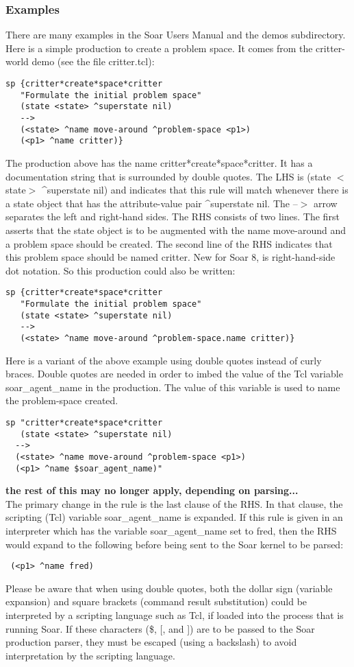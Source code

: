 \subsubsection*{Examples}
 There are many examples in the Soar Users Manual and the demos subdirectory. Here is a simple production to create a problem space. It comes from the critter-world demo (see the file critter.tcl): \begin{verbatim}
sp {critter*create*space*critter
   "Formulate the initial problem space"
   (state <state> ^superstate nil)
   -->
   (<state> ^name move-around ^problem-space <p1>)
   (<p1> ^name critter)}
\end{verbatim}
 The production above has the name critter*create*space*critter. It has a documentation string that is surrounded by double quotes. The LHS is (state $<$state$>$ \^{}superstate nil) and indicates that this rule will match whenever there is a state object that has the attribute-value pair \^{}superstate nil. The --$>$ arrow separates the left and right-hand sides. The RHS consists of two lines. The first asserts that the state object is to be augmented with the name move-around and a problem space should be created. The second line of the RHS indicates that this problem space should be named critter. 
  New for Soar 8, is right-hand-side dot notation. So this production could also be written: \begin{verbatim}
sp {critter*create*space*critter
   "Formulate the initial problem space"
   (state <state> ^superstate nil)
   -->
   (<state> ^name move-around ^problem-space.name critter)}
\end{verbatim}
 Here is a variant of the above example using double quotes instead of curly braces. Double quotes are needed in order to imbed the value of the Tcl variable soar\_agent\_name in the production. The value of this variable is used to name the problem-space created. \begin{verbatim}
sp "critter*create*space*critter
   (state <state> ^superstate nil)
  -->
  (<state> ^name move-around ^problem-space <p1>)
  (<p1> ^name $soar_agent_name)"
\end{verbatim}
 \textbf{ the rest of this may no longer apply, depending on parsing...}
\\ 
 The primary change in the rule is the last clause of the RHS. In that clause, the scripting (Tcl) variable soar\_agent\_name is expanded. If this rule is given in an interpreter which has the variable soar\_agent\_name set to fred, then the RHS would expand to the following before being sent to the Soar kernel to be parsed: \begin{verbatim}
 (<p1> ^name fred)
\end{verbatim}
 Please be aware that when using double quotes, both the dollar sign (variable expansion) and square brackets (command result substitution) could be interpreted by a scripting language such as Tcl, if loaded into the process that is running Soar. If these characters (\$, [, and ]) are to be passed to the Soar production parser, they must be escaped (using a backslash) to avoid interpretation by the scripting language. 
